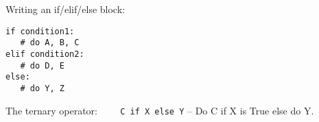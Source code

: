 Writing an if/elif/else block:
\begin{lstlisting}
if condition1:
   # do A, B, C
elif condition2:
   # do D, E
else:
   # do Y, Z
\end{lstlisting}

The ternary operator:
{\ex \lstinline|    C if X else Y|} -- Do C if X is True else do Y. 
